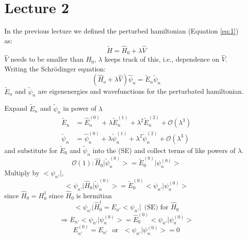 \documentclass[12pt]{article}
\begin{document}
\section{Lecture 2}
In the previous lecture we defined the perturbed hamiltonian
(Equation \ref{eq:1}) as:
\begin{equation*}
  \tilde{H} = \hat{H}_0 + \lambda \hat{V}
\end{equation*}
\noindent
$\hat{V}$ needs to be smaller than $\hat{H}_0$, $\lambda$ keeps track of this, i.e., dependence on $\hat{V}$.
Writing the Schr\"odinger equation:
\begin{equation*}
	(\hat{H}_o + \lambda \hat{V}) \hat{\psi}_n = \tilde{E}_n \tilde{\psi}_n
\end{equation*}
$\tilde{E}_n$ and $\tilde{\psi}_n$ are eigenenergies and wavefunctions for the perturbated hamiltonian.

Expand $\tilde{E}_n$ and $\tilde{\psi}_n$ in power of $\lambda$
\begin{align*}
	\tilde{E}_n & = \hat{E}^{(0)}_n + \lambda \tilde{E}^{(1)}_n + \lambda^2 \tilde{E}^{(2)}_n + \mathcal{O}(\lambda^3)\\
	\tilde{\psi}_n & = \hat{\psi}^{(0)}_n + \lambda \tilde{\psi}^{(1)}_n + \lambda^2 \tilde{\psi}^{(2)}_n + \mathcal{O}(\lambda^3)
\end{align*}
and substitute for $\tilde{E}_0$ and $\tilde{\psi}_n$ into the (SE) and collect terms of like powers of $\lambda$.
\begin{equation*}
	\mathcal{O}(1): \hat{H}_0 \big|\tilde{\psi}^{(0)}_n \big> = \tilde{E}^{(0)}_0 \big| \psi_n^{(0)} \big>
\end{equation*}
Multiply by $\big< \psi_{n'}\big|$,
\begin{equation*}
	\big< \psi_{n'}\big|\hat{H}_0 \big|\tilde{\psi}^{(0)}_n \big> = \tilde{E}^{(0)}_0 \big< \psi_{n'}\big| \psi_n^{(0)} \big>
\end{equation*}
since $\hat{H}_0 = H_0^\dag$ since $\hat{H}_0$ is hermitian
\begin{equation*}
	\big < \psi_{n'} \big| \hat{H}^\dag_0 = E_{n'} \big< \psi_{n'} \big|\,\,\,\text{(SE) for } \hat{H}_0
\end{equation*}
\begin{equation*}
	\Longrightarrow E_{n'} \big< \psi_{n'} \big| \psi_n^{(0)} \big> = 
	\hat{E}^{(0)}_0\big< \psi_{n'} \big| \psi_n^{(0)} \big> 
\end{equation*}
$$E^{(0)}_{n'} = E_{n'}\,\,\,\,\text{or}\,\,\,\,\big< \psi_{n'} \big| \psi_n^{(0)} \big> = 0$$
\end{document}
